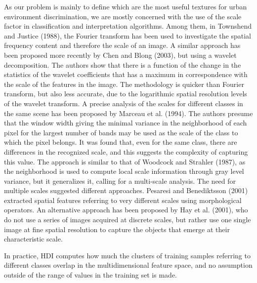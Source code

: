 \documentclass[paper=a4, fontsize=11pt]{scrartcl}
\begin{document}
As our problem is mainly to define which are the most useful textures for urban environment discrimination, we are mostly concerned with the use of the scale factor
in classification and interpretation algorithms. 
Among them, in Townshend and Justice (1988), the Fourier transform has been used to investigate the spatial frequency content and therefore the scale of an image. 
A similar approach has been proposed more recently by Chen and Blong (2003), but using a wavelet decomposition. 
The authors show that there is a function of the change in the statistics of the wavelet coefficients that has a maximum in correspondence with the scale of the features in the image. 
The methodology is quicker than Fourier transform, but also less accurate, due to the logarithmic spatial resolution levels of the wavelet transform. 
A precise analysis of the scales for different classes in the same scene has been proposed by Marceau et al. (1994). 
The authors presume that the window width giving the minimal variance in the neighborhood of each pixel for the largest number of bands may be used as the scale of the class to which the pixel belongs. 
It was found that, even for the same class, there are differences in the recognized scale, and this suggests the complexity of capturing this value. 
The approach is similar to that of Woodcock and Strahler (1987), as the neighborhood is used to compute local scale information through gray level variance, but it generalizes it, calling for a multi-scale analysis. 
The need for multiple scales suggested different approaches. 
Pesaresi and Benediktsson (2001) extracted spatial features referring to very different scales using morphological operators. 
An alternative approach has been proposed by Hay et al. (2001), who do not use  a series of images acquired at discrete scales, but rather use one single image at fine spatial resolution to capture the objects that emerge at their characteristic scale.

In practice, HDI computes how much the clusters of training samples referring to different classes overlap in the multidimensional feature space, and no assumption outside of the range of values in the training set is made.
\end{document}
